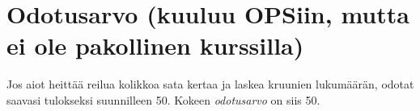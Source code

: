 \documentclass[12pt,leqno,a4paper,oneside]{amsart}
\theoremstyle{definition}
\theoremstyle{remark}
\numberwithin{equation}{section}
\begin{document}











\newpage
\section{Odotusarvo (kuuluu OPSiin, mutta ei ole pakollinen kurssilla)}

Jos aiot heittää reilua kolikkoa sata kertaa ja laskea kruunien lukumäärän, odotat saavasi tulokseksi suunnilleen 50. Kokeen \emph{odotusarvo}
on siis 50. 
\end{document}

